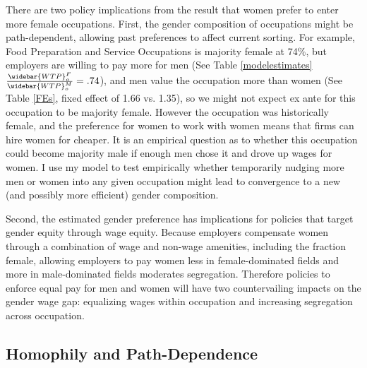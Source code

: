 \documentclass[12pt]{article}
\begin{document}
There are two policy implications from the result that women prefer to enter more female occupations. First, the gender composition of occupations might be path-dependent, allowing past preferences to affect current sorting. For example, Food Preparation and Service Occupations is majority female at 74\%, but employers are willing to pay more for men (See Table \ref{modelestimates} $ \frac{\widebar{WTP}^F_o}{\widebar{WTP}^M_o} = .74$), and men value the occupation more than women (See Table \ref{FEs}, fixed effect of 1.66 vs. 1.35), so we might not expect ex ante for this occupation to be majority female. However the occupation was historically female, and the preference for women to work with women means that firms can hire women for cheaper. It is an empirical question as to whether this occupation could become majority male if enough men chose it and drove up wages for women. I use my model to test empirically whether temporarily nudging more men or women into any given occupation might lead to convergence to a new (and possibly more efficient) gender composition.

Second, the estimated gender preference has implications for policies that target gender equity through wage equity. Because employers compensate women through a combination of wage and non-wage amenities, including the fraction female, allowing employers to pay women less in female-dominated fields and more in male-dominated fields moderates segregation. Therefore policies to enforce equal pay for men and women will have two countervailing impacts on the gender wage gap: equalizing wages within occupation and increasing segregation across occupation.

\subsection{Homophily and Path-Dependence}




\end{document}
